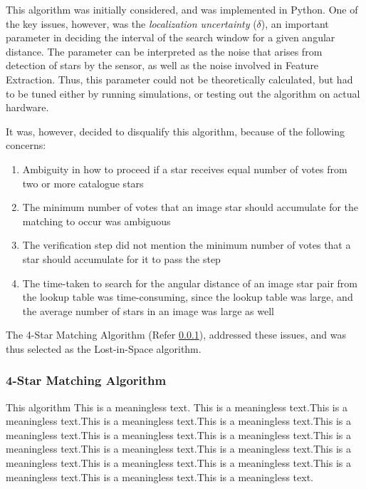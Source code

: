 \documentclass[../../main.tex]{subfiles}
\begin{document}

This algorithm was initially considered, and was implemented in Python.
One of the key issues, however, was the \textit{localization uncertainty} ($\delta$), an important parameter in deciding the interval of the search window for a given angular distance. 
The parameter can be interpreted as the noise that arises from detection of stars by the sensor, as well as the noise involved in Feature Extraction. Thus, this parameter could not be theoretically calculated, but had to be tuned either by running simulations, or testing out the algorithm on actual hardware.

It was, however, decided to disqualify this algorithm, because of the following concerns:
\begin{enumerate}
    \item Ambiguity in how to proceed if a star receives equal number of votes from two or more catalogue stars
    
    \item The minimum number of votes that an image star should accumulate for the matching to occur was ambiguous
    
    \item The verification step did not mention the minimum number of votes that a star should accumulate for it to pass the step
    
    \item The time-taken to search for the angular distance of an image star pair from the lookup table was time-consuming, since the lookup table was large, and the average number of stars in an image was large as well 
\end{enumerate}

The 4-Star Matching Algorithm (Refer \ref{sec:4SM}), addressed these issues, and was thus selected as the Lost-in-Space algorithm.


\subsubsection{4-Star Matching Algorithm}
\label{sec:4SM}

This algorithm \cite{dong2006brightness}
This is a meaningless text. This is a meaningless text.This is a meaningless text.This is a meaningless text.This is a meaningless text.This is a meaningless text.This is a meaningless text.This is a meaningless text.This is a meaningless text.This is a meaningless text.This is a meaningless text.This is a meaningless text.This is a meaningless text.This is a meaningless text.This is a meaningless text.This is a meaningless text.This is a meaningless text.
\end{document}
